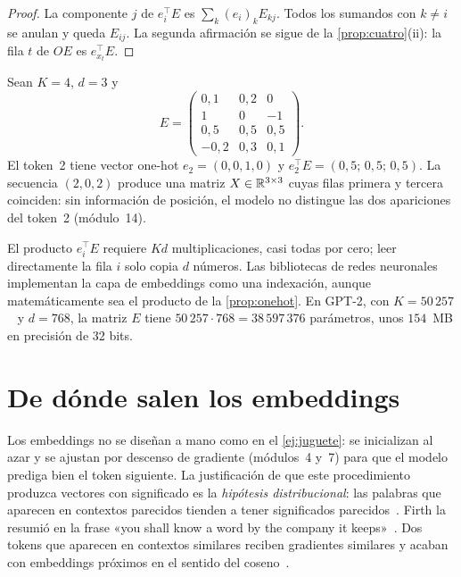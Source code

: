 \begin{proof}
La componente $j$ de $e_i^{\top}E$ es $\sum_k(e_i)_kE_{kj}$. Todos los sumandos con $k\neq i$ se anulan y queda $E_{ij}$. La segunda afirmación se sigue de la \cref{prop:cuatro}(ii): la fila $t$ de $OE$ es $e_{x_t}^{\top}E$.
\end{proof}

\begin{ejemplo}\label{ej:embedding}
Sean $K=4$, $d=3$ y
\[
E=\begin{pmatrix}0{,}1&0{,}2&0\\1&0&-1\\0{,}5&0{,}5&0{,}5\\-0{,}2&0{,}3&0{,}1\end{pmatrix}.
\]
El token~2 tiene vector one-hot $e_2=(0,0,1,0)$ y $e_2^{\top}E=(0{,}5;\,0{,}5;\,0{,}5)$. La secuencia $(2,0,2)$ produce una matriz $X\in\mathbb{R}^{3\times 3}$ cuyas filas primera y tercera coinciden: sin información de posición, el modelo no distingue las dos apariciones del token~2 (módulo~14).
\end{ejemplo}

\begin{observacion}
El producto $e_i^{\top}E$ requiere $Kd$ multiplicaciones, casi todas por cero; leer directamente la fila $i$ solo copia $d$ números. Las bibliotecas de redes neuronales implementan la capa de embeddings como una indexación, aunque matemáticamente sea el producto de la \cref{prop:onehot}. En GPT-2, con $K=50\,257$~\cite[§2.3]{radford} y $d=768$, la matriz $E$ tiene $50\,257\cdot 768=38\,597\,376$ parámetros, unos $154$~MB en precisión de 32 bits.
\end{observacion}

\section{De dónde salen los embeddings}

Los embeddings no se diseñan a mano como en el \cref{ej:juguete}: se inicializan al azar y se ajustan por descenso de gradiente (módulos~4 y~7) para que el modelo prediga bien el token siguiente. La justificación de que este procedimiento produzca vectores con significado es la \emph{hipótesis distribucional}: las palabras que aparecen en contextos parecidos tienden a tener significados parecidos~\cite{harris}. Firth la resumió en la frase «you shall know a word by the company it keeps»~\cite{firth}. Dos tokens que aparecen en contextos similares reciben gradientes similares y acaban con embeddings próximos en el sentido del coseno~\cite[cap.~5]{jm3}.


